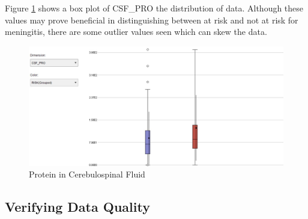 \newpage
Figure \ref{box}  shows a box plot of CSF\_PRO the distribution of data. Although these values may prove beneficial in distinguishing between at risk and not at risk for meningitis, there are some outlier values seen which can skew the data.  

\begin{figure}[ht]
	\begin{center}
		\advance\leftskip-3cm
		\advance\rightskip-3cm
		\includegraphics[keepaspectratio=true,scale=0.6]{__resources/boxplot.jpg}
		\caption{Protein in Cerebulospinal Fluid}
		\label{box}
	\end{center}
\end{figure}



\newpage

\subsection*{Verifying Data Quality}

